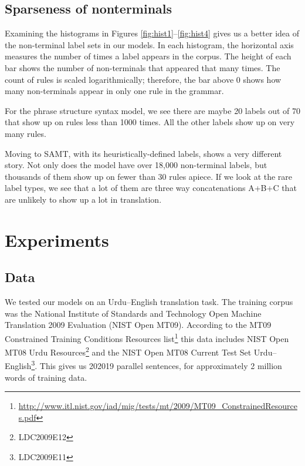 \documentclass{article}
\begin{document}



\subsection{Sparseness of nonterminals}

Examining the histograms in Figures \ref{fig:hist1}--\ref{fig:hist4} gives us a better idea of the non-terminal label sets in our models. In each histogram, the horizontal axis measures the number of times a label appears in the corpus. The height of each bar shows the number of non-terminals that appeared that many times. The count of rules is scaled logarithmically; therefore, the bar above 0 shows how many non-terminals appear in only one rule in the grammar.

For the phrase structure syntax model, we see there are maybe 20 labels out of 70 that show up on rules less than 1000 times. All the other labels show up on very many rules.

Moving to SAMT, with its heuristically-defined labels, shows a very different story. Not only does the model have over 18,000 non-terminal labels, but thousands of them show up on fewer than 30 rules apiece. If we look at the rare label types, we see that a lot of them are three way concatenations A+B+C that are unlikely to show up a lot in translation. 

\section{Experiments}

\subsection{Data}

We tested our models on an Urdu--English translation task. The training corpus was the National Institute of Standards and Technology Open Machine Translation 2009 Evaluation (NIST Open MT09). According to the MT09 Constrained Training Conditions Resources list\footnote{\url{http://www.itl.nist.gov/iad/mig/tests/mt/2009/MT09_ConstrainedResources.pdf}} this data includes NIST Open MT08 Urdu Resources\footnote{LDC2009E12} and the NIST Open MT08 Current Test Set Urdu--English\footnote{LDC2009E11}. This gives us 202019 parallel sentences, for approximately 2 million words of training data.
\end{document}
